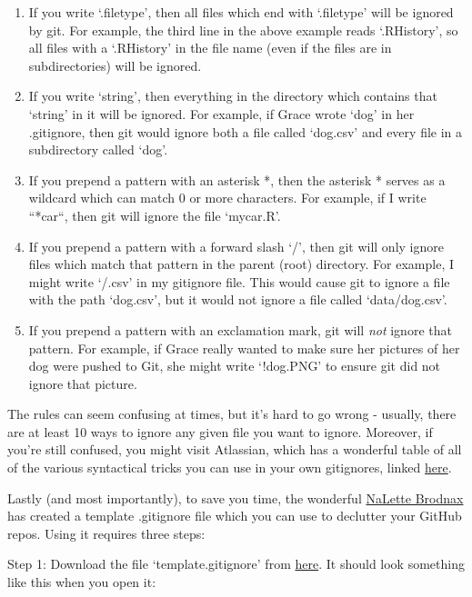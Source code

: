 \documentclass[]{book}
\begin{document}
\begin{enumerate}
\def\labelenumi{\arabic{enumi}.}
\item
  If you write `.filetype', then all files which end with `.filetype'
  will be ignored by git. For example, the third line in the above
  example reads `.RHistory', so all files with a `.RHistory' in the file
  name (even if the files are in subdirectories) will be ignored.
\item
  If you write `string', then everything in the directory which contains
  that `string' in it will be ignored. For example, if Grace wrote `dog'
  in her .gitignore, then git would ignore both a file called `dog.csv'
  and every file in a subdirectory called `dog'.
\item
  If you prepend a pattern with an asterisk *, then the asterisk *
  serves as a wildcard which can match 0 or more characters. For
  example, if I write ``*car``, then git will ignore the file `mycar.R'.
\item
  If you prepend a pattern with a forward slash `/', then git will only
  ignore files which match that pattern in the parent (root) directory.
  For example, I might write `/.csv' in my gitignore file. This would
  cause git to ignore a file with the path `dog.csv', but it would not
  ignore a file called `data/dog.csv'.
\item
  If you prepend a pattern with an exclamation mark, git will \emph{not}
  ignore that pattern. For example, if Grace really wanted to make sure
  her pictures of her dog were pushed to Git, she might write `!dog.PNG'
  to ensure git did not ignore that picture.
\end{enumerate}

The rules can seem confusing at times, but it's hard to go wrong -
usually, there are at least 10 ways to ignore any given file you want to
ignore. Moreover, if you're still confused, you might visit Atlassian,
which has a wonderful table of all of the various syntactical tricks you
can use in your own gitignores, linked
\href{https://www.atlassian.com/git/tutorials/gitignore}{here}.

Lastly (and most importantly), to save you time, the wonderful
\href{https://www.iq.harvard.edu/people/nalette-brodnax}{NaLette
Brodnax} has created a template .gitignore file which you can use to
declutter your GitHub repos. Using it requires three steps:

Step 1: Download the file `template.gitignore' from
\href{https://github.com/IQSS/Rbuild/blob/master/template.gitignore}{here}.
It should look something like this when you open it:
\end{document}
